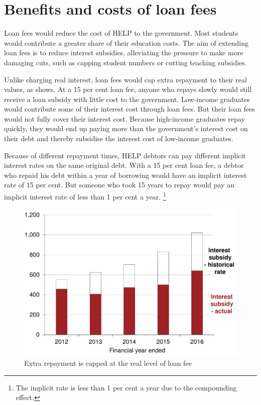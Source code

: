 \documentclass[embargoed]{grattan}
\begin{document}
{\begin{figure}
\end{figure}

\section{Benefits and costs of loan fees}\label{sec:benefits-and-costs-of-loan-fees}

Loan fees would reduce the cost of \gls{HELP} to the government.
Most students would contribute a greater share of their education costs.
The aim of extending loan fees is to reduce interest subsidies, alleviating the pressure to make more damaging cuts, such as capping student numbers or cutting teaching subsidies.

Unlike charging real interest, loan fees would cap extra repayment to their real values, as  shows.
At a 15 per cent loan fee, anyone who repays slowly would still receive a loan subsidy with little cost to the government.
Low-income graduates would contribute some of their interest cost through loan fees.
But their loan fees would not fully cover their interest cost.
Because high-income graduates repay quickly, they would end up paying more than the government's interest cost on their debt and thereby subsidise the interest cost of low-income graduates.

Because of different repayment times, \gls{HELP} debtors can pay different implicit interest rates on the same original debt.
With a 15 per cent loan fee, a debtor who repaid his debt within a year of borrowing would have an implicit interest rate of 15 per cent.
But someone who took 15 years to repay would pay an implicit interest rate of less than 1 per cent a year.%
\footnote{The implicit rate is less than 1 per cent a year due to the compounding effect.}

\begin{figure}
\caption{Extra repayment is capped at the real level of loan fee}\label{fig:fig22-extra-repayment-capped-at-real-level-of-loan-fee}

\includegraphics[page=22]{atlas/Chartpack.pdf}


\end{figure}}
\end{document}
